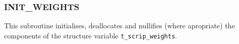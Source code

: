 \documentclass[11pt,twoside]{article}
\begin{document}


\subsubsection{INIT\_WEIGHTS\label{INITWEIGHTS}}
This subroutine initialises, deallocates and nullifies (where
apropriate) the components of the structure
variable \verb|t_scrip_weights|.
\end{document}
